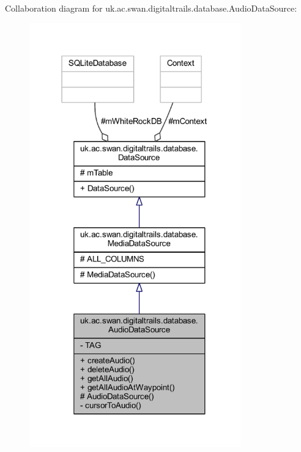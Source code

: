 Collaboration diagram for uk.\+ac.\+swan.\+digitaltrails.\+database.\+Audio\+Data\+Source\+:
\nopagebreak
\begin{figure}[H]
\begin{center}
\leavevmode
\includegraphics[width=259pt]{classuk_1_1ac_1_1swan_1_1digitaltrails_1_1database_1_1_audio_data_source__coll__graph}
\end{center}
\end{figure}
